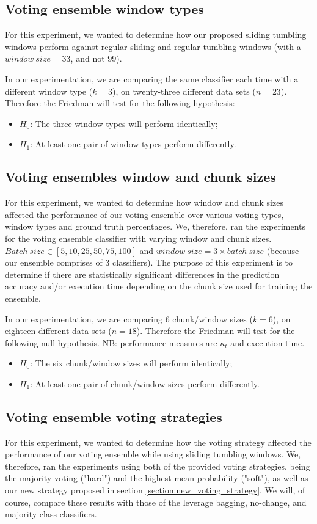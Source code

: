 \subsection{Voting ensemble window types}
For this experiment, we wanted to determine how our proposed sliding tumbling windows perform against regular sliding and regular tumbling windows (with a $window\ size=33$, and not $99$).

In our experimentation, we are comparing the same classifier each time with a different window type ($k=3$), on twenty-three different data sets ($n=23$). Therefore the Friedman will test for the following hypothesis:
\begin{itemize}
\item $H_0$: The three window types will perform identically;
\item $H_1$: At least one pair of window types perform differently.
\end{itemize}

\subsection{Voting ensembles window and chunk sizes}
For this experiment, we wanted to determine how window and chunk sizes affected the performance of our voting ensemble over various voting types, window types and ground truth percentages. We, therefore, ran the experiments for the voting ensemble classifier with varying window and chunk sizes. $Batch\ size \in [5, 10, 25, 50, 75, 100]$ and $window\ size = 3\times batch\ size$ (because our ensemble comprises of 3 classifiers).
The purpose of this experiment is to determine if there are statistically significant differences in the prediction accuracy and/or execution time depending on the chunk size used for training the ensemble.

In our experimentation, we are comparing 6 chunk/window sizes ($k=6$), on eighteen different data sets ($n=18$). Therefore the Friedman will test for the following null hypothesis. NB: performance measures are $\kappa_t$ and execution time.
\begin{itemize}
\item $H_0$: The six chunk/window sizes will perform identically;
\item $H_1$: At least one pair of chunk/window sizes perform differently.
\end{itemize}

\subsection{Voting ensemble voting strategies}
For this experiment, we wanted to determine how the voting strategy affected the performance of our voting ensemble while using sliding tumbling windows. We, therefore, ran the experiments using both of the provided voting strategies, being the majority voting ("hard") and the highest mean probability ("soft"), as well as our new strategy proposed in section \ref{section:new_voting_strategy}.
We will, of course, compare these results with those of the leverage bagging, no-change, and majority-class classifiers.

